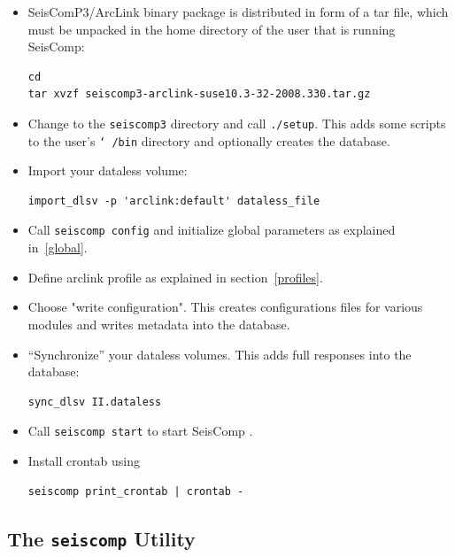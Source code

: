 \documentclass[11pt,a4paper,titlepage]{article}
\newcommand{\dir}[1]{\texttt{#1}}
\newcommand{\cmd}[1]{\texttt{#1}}
\newcommand{\seiscomp}{SeisComp }
\begin{document}
\begin{itemize}
\item SeisComP3/ArcLink binary package is distributed in form of a tar file,
which must be unpacked in the home directory of the user that is running
SeisComp:
\begin{verbatim}
cd
tar xvzf seiscomp3-arclink-suse10.3-32-2008.330.tar.gz
\end{verbatim}

\item Change to the \dir{seiscomp3} directory and call \cmd{./setup}. This
adds some scripts to the user's \dir{\char`~/bin} directory and optionally
creates the database.

\item Import your dataless volume:
\begin{verbatim}
import_dlsv -p 'arclink:default' dataless_file
\end{verbatim}

\item Call \cmd{seiscomp config} and initialize global parameters as
explained in~\ref{global}. 

\item Define arclink profile as explained in section~\ref{profiles}.

\item Choose "write configuration". This creates configurations files for
various modules and writes metadata into the database.

\item ``Synchronize'' your dataless volumes. This adds full responses into
the database:
\begin{verbatim}
sync_dlsv II.dataless
\end{verbatim}

\item Call \cmd{seiscomp start} to start \seiscomp.

\item Install crontab using
\begin{verbatim}
seiscomp print_crontab | crontab -
\end{verbatim}

\end{itemize}


\subsection{The \cmd{seiscomp} Utility}
\end{document}
